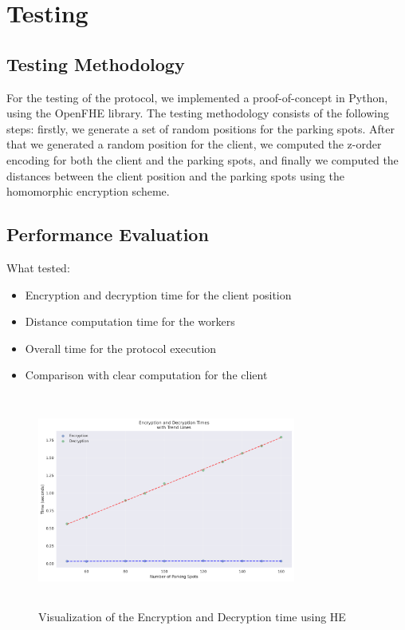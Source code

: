 \chapter{Testing}
\section{Testing Methodology}

For the testing of the protocol, we implemented a proof-of-concept in Python, using the OpenFHE library\cite{openFHE}. The testing methodology consists of the following steps: firstly, we generate a set of random positions for the parking spots. After that we generated a random position for the client, we computed the z-order encoding for both the client and the parking spots, and finally we computed the distances between the client position and the parking spots using the homomorphic encryption scheme.

\section{Performance Evaluation}

What tested:
\begin{itemize}
    \item Encryption and decryption time for the client position
    \item Distance computation time for the workers
    \item Overall time for the protocol execution
    \item Comparison with clear computation for the client
\end{itemize}

\begin{figure}[h]
    \centering
    \includegraphics[width=8.5cm,height=7cm]{img/crypto_times.png}
    \caption{Visualization of the Encryption and Decryption time using HE}
    \label{fig:testing}
\end{figure}

